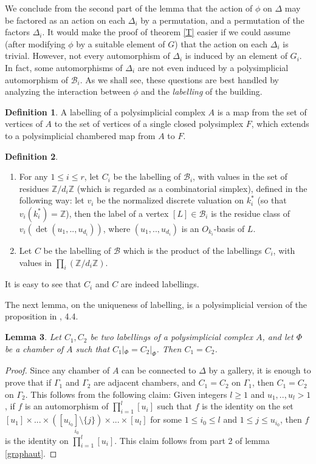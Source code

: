 \documentclass{amsart}
\theoremstyle{theorem}
\theoremstyle{lemma}
\newtheorem{lemma}{Lemma}[section]
\theoremstyle{prop}
\theoremstyle{definition}
\newtheorem{definition}[lemma]{Definition}
\theoremstyle{corollary}
\theoremstyle{remark}
\newcommand{\Z}{\mathbb{Z}}
\newcommand{\B}{\mathcal{B}}
\begin{document}
We conclude from the second part of the lemma that the action of $\phi$ on $\Delta$ may be factored as an action on each $\Delta_i$ by a permutation, and a permutation of the factors $\Delta_i$. It would make the proof of theorem \ref{T} easier if we could assume (after modifying $\phi$ by a suitable element of $G$) that the action on each $\Delta_i$ is trivial. However, not every automorphism of $\Delta_i$ is induced by an element of $G_i$. In fact, some automorphisms of $\Delta_i$ are not even induced by a polysimplicial automorphism of $\B_i$. As we shall see, these questions are best handled by analyzing the interaction between $\phi$ and the \emph{labelling} of the building. 

\begin{definition} A labelling of a polysimplicial complex $A$ is a map from the set of vertices of $A$ to the set of vertices of a single closed polysimplex $F$, which extends to a polysimplicial chambered map from $A$ to $F$. 
\end{definition}

\begin{definition} \label{def:label}
\begin{enumerate}
\item
For any $1\leq i \leq r$, let $C_i$ be the labelling of $\B_i$, with values in the set of residues $\Z / d_i \Z$ (which is regarded as a combinatorial simplex), defined in the following way: let $v_i$ be the normalized discrete valuation on $k_i^*$ (so that $v_i(k_i^*)=\Z$), then the label of a vertex $[L]\in \B_i$ is the residue class of $v_i(\det(u_1,..,u_{d_i}))$, where $(u_1,..,u_{d_i})$ is an $O_{k_i}$-basis of $L$.
\item
Let $C$ be the labelling of $\B$ which is the product of the labellings $C_i$, with values in $\prod_i(\Z/d_i\Z)$.
\end{enumerate}
\end{definition}

It is easy to see that $C_i$ and $C$ are indeed labellings.

The next lemma, on the uniqueness of labelling, is a polysimplicial version of the proposition in \cite{gar}, 4.4.

\begin{lemma}
\label{lem:label}
Let $C_1,C_2$ be two labellings of a polysimplicial complex $A$, and let $\Phi$ be a chamber of $A$ such that $C_1|_\Phi = C_2|_\Phi$. Then $C_1=C_2$.
\end{lemma}

\begin{proof}
Since any chamber of $A$ can be connected to $\Delta$ by a gallery, it is enough to prove that if $\Gamma_1$ and $\Gamma_2$ are adjacent chambers, and $C_1=C_2$ on $\Gamma_1$, then $C_1=C_2$ on $\Gamma_2$. This follows from the following claim: Given integers $l\geq 1$ and $u_1,..,u_l>1$, if $f$ is an automorphism of $\prod_{i=1}^l [u_i]$ such that $f$ is the identity on the set $[u_1]\times ... \times \underset{i_0}{([u_{i_0}] \setminus \{j \})} \times ... \times [u_l]$ for some $1\leq i_0 \leq l$ and $1\leq j \leq u_{i_0}$, then $f$ is the identity on $\prod_{i=1}^l [u_i]$. This claim follows from part 2 of lemma \ref{graphaut}.
\end{proof}
\end{document}
